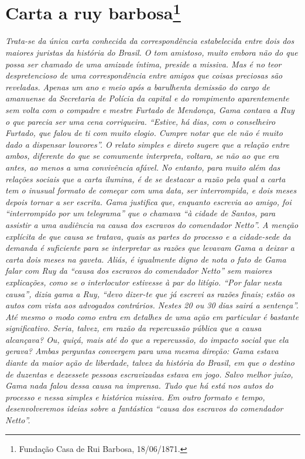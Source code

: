 {\chapter{Carta a ruy barbosa\footnote{Fundação Casa de Rui Barbosa, 18/06/1871.}}%

\begin{didascalia}
\emph{Trata-se da única carta conhecida da correspondência estabelecida
entre dois dos maiores juristas da história do Brasil. O tom amistoso,
muito embora não do que possa ser chamado de uma amizade íntima, preside
a missiva. Mas é no teor despretencioso de uma correspondência entre
amigos que coisas preciosas são reveladas. Apenas um ano e meio após a
barulhenta demissão do cargo de amanuense da Secretaria de Polícia da
capital e do rompimento aparentemente sem volta com o compadre e mestre
Furtado de Mendonça, Gama contava a Ruy o que parecia ser uma cena
corriqueira. ``Estive, há dias, com o conselheiro Furtado, que falou de
ti com muito elogio. Cumpre notar que ele não é muito dado a dispensar
louvores''. O relato simples e direto sugere que a relação entre ambos,
diferente do que se comumente interpreta, voltara, se não ao que era
antes, ao menos a uma convivência afável. No entanto, para muito além
das relações sociais que a carta ilumina, é de se destacar a razão pela
qual a carta tem o inusual formato de começar com uma data, ser
interrompida, e dois meses depois tornar a ser escrita. Gama justifica
que, enquanto escrevia ao amigo, foi ``interrompido por um telegrama'' que
o chamava ``à cidade de Santos, para assistir a uma audiência na causa
dos escravos do comendador Netto''. A menção explícita de que causa se
tratava, quais as partes do processo e a cidade-sede da demanda é
suficiente para se interpretar as razões que levavam Gama a deixar a
carta dois meses na gaveta. Aliás, é igualmente digno de nota o fato de
Gama falar com Ruy da ``causa dos escravos do comendador Netto'' sem
maiores explicações, como se o interlocutor estivesse à par do litígio.
``Por falar nesta causa'', dizia gama a Ruy, ``devo dizer-te que já escrevi
as razões finais; estão os autos com vista aos advogados contrários.
Nestes 20 ou 30 dias sairá a sentença''. Até mesmo o modo como entra em
detalhes de uma ação em particular é bastante significativo. Seria,
talvez, em razão da repercussão pública que a causa alcançava? Ou,
quiçá, mais até do que a repercussão, do impacto social que ela gerava?
Ambas perguntas convergem para uma mesma direção: Gama estava diante da
maior ação de liberdade, talvez da história do Brasil, em que o destino
de duzentas e dezessete pessoas escravizadas estava em jogo. Salvo
melhor juízo, Gama nada falou dessa causa na imprensa. Tudo que há está
nos autos do processo e nessa simples e histórica missiva. Em outro
formato e tempo, desenvolveremos ideias sobre a fantástica ``causa dos
escravos do comendador Netto''.}
\end{didascalia}

}
